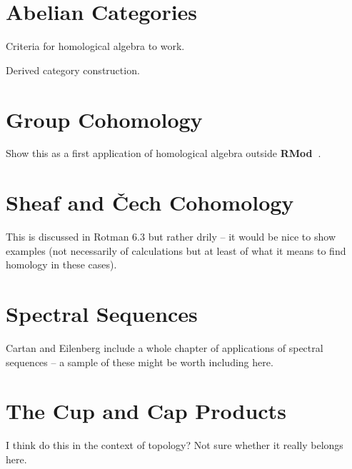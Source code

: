 \documentclass[oneside,english]{amsbook}
\numberwithin{section}{chapter}
\theoremstyle{plain}
\theoremstyle{definition}
\providecommand{\Cech}{\v{C}ech }
\newcommand{\catname}[1]{{\normalfont\textbf{#1}}}
\newcommand{\RMod}{\catname{RMod\ }}
\begin{document}
	\chapter{Abelian Categories}
	
		Criteria for homological algebra to work.
		
		Derived category construction.
	
	\chapter{Group Cohomology}
	
		Show this as a first application of homological algebra outside \RMod.
	
	\chapter{Sheaf and \Cech Cohomology}

		This is discussed in Rotman 6.3 but rather drily -- it would be nice to show examples (not necessarily of calculations but at least of what it means to find homology in these cases).
		
	\chapter{Spectral Sequences}

		Cartan and Eilenberg include a whole chapter of applications of spectral sequences -- a sample of these might be worth including here.

	\chapter{The Cup and Cap Products}

		I think do this in the context of topology? Not sure whether it really belongs here.
	
	
\end{document}
